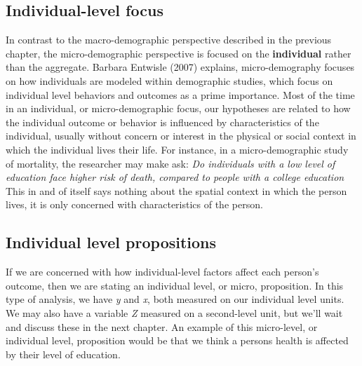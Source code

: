 \documentclass[
  letterpaper,
  DIV=11,
  numbers=noendperiod]{scrreprt}
\begin{document}
\hypertarget{individual-level-focus}{%
\subsection{Individual-level focus}\label{individual-level-focus}}

In contrast to the macro-demographic perspective described in the
previous chapter, the micro-demographic perspective is focused on the
\textbf{individual} rather than the aggregate. Barbara Entwisle (2007)
explains, micro-demography focuses on how individuals are modeled within
demographic studies, which focus on individual level behaviors and
outcomes as a prime importance. Most of the time in an individual, or
micro-demographic focus, our hypotheses are related to how the
individual outcome or behavior is influenced by characteristics of the
individual, usually without concern or interest in the physical or
social context in which the individual lives their life. For instance,
in a micro-demographic study of mortality, the researcher may make ask:
\emph{Do individuals with a low level of education face higher risk of
death, compared to people with a college education} This in and of
itself says nothing about the spatial context in which the person lives,
it is only concerned with characteristics of the person.

\hypertarget{individual-level-propositions}{%
\subsection{Individual level
propositions}\label{individual-level-propositions}}

If we are concerned with how individual-level factors affect each
person's outcome, then we are stating an individual level, or micro,
proposition. In this type of analysis, we have \emph{y} and \emph{x},
both measured on our individual level units. We may also have a variable
\emph{Z} measured on a second-level unit, but we'll wait and discuss
these in the next chapter. An example of this micro-level, or individual
level, proposition would be that we think a persons health is affected
by their level of education.
\end{document}
